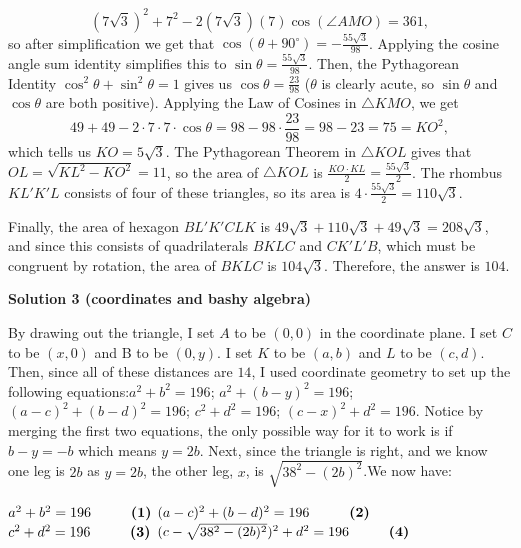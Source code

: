\begin{enumerate}
 \[(7\sqrt{3})^2+7^2-2(7\sqrt{3})(7)\cos (\angle AMO)=361,\] so after simplification we get that $\cos (\theta +90^{\circ})=-\frac{55\sqrt{3}}{98}$. Applying the cosine angle sum identity simplifies this to $\sin \theta =\frac{55\sqrt{3}}{98}$. Then, the Pythagorean Identity $\cos^2\theta +\sin^2\theta =1$ gives us $\cos \theta =\frac{23}{98}$ ($\theta$ is clearly acute, so $\sin \theta$ and $\cos \theta$ are both positive). Applying the Law of Cosines in $\triangle KMO$, we get 
 \[49+49-2\cdot 7\cdot 7\cdot \cos \theta =98-98\cdot \frac{23}{98}=98-23=75=KO^2,\] which tells us $KO=5\sqrt{3}$. The Pythagorean Theorem in $\triangle KOL$ gives that $OL=\sqrt{KL^2-KO^2}={11}$, so the area of $\triangle KOL$ is $\frac{KO\cdot KL}{2}=\frac{55\sqrt{3}}{2}$. The rhombus $KL'K'L$ consists of four of these triangles, so its area is $4\cdot \frac{55\sqrt{3}}{2}=110\sqrt{3}$. 

 Finally, the area of hexagon $BL'K'CLK$ is $49\sqrt{3}+110\sqrt{3}+49\sqrt{3}=208\sqrt{3}$, and since this consists of quadrilaterals $BKLC$ and $CK'L'B$, which must be congruent by rotation, the area of $BKLC$ is $104\sqrt{3}$. Therefore, the answer is $\boxed{104}$.

 



\textbf{Solution 3 (coordinates and bashy algebra)}

By drawing out the triangle, I set $A$ to be $(0, 0)$ in the coordinate plane. I set $C$ to be $(x, 0)$ and B to be $(0, y)$. I set $K$ to be $(a, b)$ and $L$ to be $(c, d)$. Then, since all of these distances are $14$, I used coordinate geometry to set up the following equations:$a^{2} + b^{2} = 196$; $a^{2} + (b - y)^{2} = 196$; $(a - c)^{2} + (b - d)^{2} = 196$; $c^{2} + d^{2} = 196$; $(c - x)^{2} + d^{2} = 196$. Notice by merging the first two equations, the only possible way for it to work is if $b - y = -b$ which means $y = 2b$. Next, since the triangle is right, and we know one leg is $2b$ as $y = 2b$, the other leg, $x$, is $\sqrt{38^{2} - (2b)^{2}}$.We now have:

 $a^{2} + b^{2} = 196  \hspace{1 cm} \textbf{(1)}$
$(a - c)^{2} + (b - d)^{2} = 196 \hspace{1 cm} \textbf{(2)}$
$c^{2} + d^{2} = 196  \hspace{1 cm} \textbf{(3)}$
$(c - \sqrt{38^{2} - (2b)^{2}})^{2} + d^{2} = 196  \hspace{1 cm} \textbf{(4)}$


\end{enumerate}
